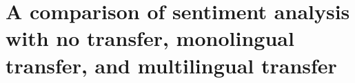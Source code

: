 \chapter{A comparison of sentiment analysis with no transfer, monolingual transfer, and multilingual transfer}\label{chapter:x}
